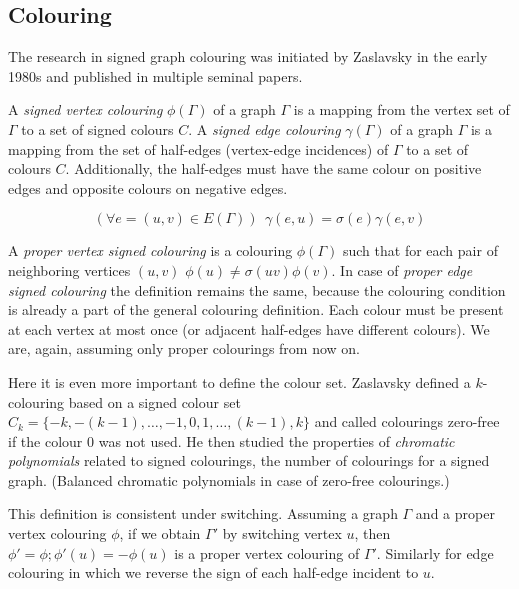 \subsection{Colouring}

The research in signed graph colouring was initiated by Zaslavsky\cite{zaslavsky-graphs} in the early 1980s and published in multiple seminal papers\cite{zaslavsky-invariants,zaslavsky-colouring,zaslavsky-colourful}.

\begin{definition}
    A \textit{signed vertex colouring} $\phi(\Gamma)$ of a graph $\Gamma$ is a mapping from the vertex set of $\Gamma$ to a set of signed colours $C$. A \textit{signed edge colouring} $\gamma(\Gamma)$ of a graph $\Gamma$ is a mapping from the set of half-edges (vertex-edge incidences) of $\Gamma$ to a set of colours $C$. Additionally, the half-edges must have the same colour on positive edges and opposite colours on negative edges.

    $$(\forall e = (u,v) \in E(\Gamma)) ~~ \gamma(e, u) = \sigma(e)\gamma(e, v)$$
\end{definition}

\begin{definition}
    A \textit{proper vertex signed colouring} is a colouring $\phi(\Gamma)$ such that for each pair of neighboring vertices $(u,v)$ $\phi(u) \neq \sigma(uv)\phi(v)$. In case of \textit{proper edge signed colouring} the definition remains the same, because the colouring condition is already a part of the general colouring definition. Each colour must be present at each vertex at most once (or adjacent half-edges have different colours). We are, again, assuming only proper colourings from now on.
\end{definition}

Here it is even more important to define the colour set. Zaslavsky\cite{zaslavsky-colouring} defined a $k$-colouring based on a signed colour set $C_k = \{-k, -(k-1), \dots, -1, 0, 1, \dots, (k-1), k\}$ and called colourings zero-free if the colour $0$ was not used. He then studied the properties of \textit{chromatic polynomials} related to signed colourings, the number of colourings for a signed graph. (Balanced chromatic polynomials in case of zero-free colourings.)

This definition is consistent under switching. Assuming a graph $\Gamma$ and a proper vertex colouring $\phi$, if we obtain $\Gamma'$ by switching vertex $u$, then $\phi' = \phi; \phi'(u) = -\phi(u)$ is a proper vertex colouring of $\Gamma'$. Similarly for edge colouring in which we reverse the sign of each half-edge incident to $u$.

